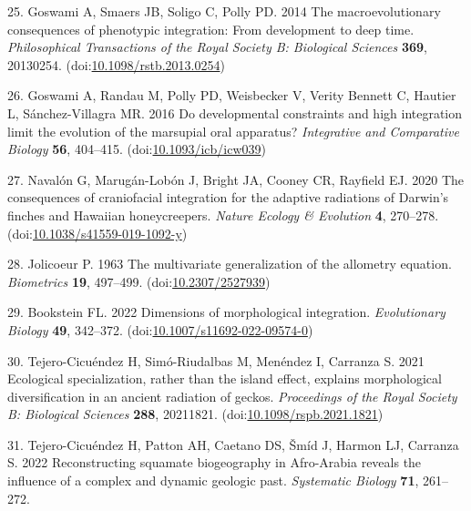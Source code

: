 \documentclass[
  11pt,
]{article}
\begin{document}
\leavevmode\hypertarget{ref-Goswami2014}{}%
25. Goswami A, Smaers JB, Soligo C, Polly PD. 2014 The macroevolutionary
consequences of phenotypic integration: From development to deep time.
\emph{Philosophical Transactions of the Royal Society B: Biological
Sciences} \textbf{369}, 20130254.
(doi:\href{https://doi.org/10.1098/rstb.2013.0254}{10.1098/rstb.2013.0254})

\leavevmode\hypertarget{ref-Goswami2016}{}%
26. Goswami A, Randau M, Polly PD, Weisbecker V, Verity Bennett C,
Hautier L, Sánchez-Villagra MR. 2016 Do developmental constraints and
high integration limit the evolution of the marsupial oral apparatus?
\emph{Integrative and Comparative Biology} \textbf{56}, 404--415.
(doi:\href{https://doi.org/10.1093/icb/icw039}{10.1093/icb/icw039})

\leavevmode\hypertarget{ref-Navalon2020}{}%
27. Navalón G, Marugán-Lobón J, Bright JA, Cooney CR, Rayfield EJ. 2020
The consequences of craniofacial integration for the adaptive radiations
of Darwin's finches and Hawaiian honeycreepers. \emph{Nature Ecology \&
Evolution} \textbf{4}, 270--278.
(doi:\href{https://doi.org/10.1038/s41559-019-1092-y}{10.1038/s41559-019-1092-y})

\leavevmode\hypertarget{ref-Jolicoeur1963}{}%
28. Jolicoeur P. 1963 The multivariate generalization of the allometry
equation. \emph{Biometrics} \textbf{19}, 497--499.
(doi:\href{https://doi.org/10.2307/2527939}{10.2307/2527939})

\leavevmode\hypertarget{ref-Bookstein2022}{}%
29. Bookstein FL. 2022 Dimensions of morphological integration.
\emph{Evolutionary Biology} \textbf{49}, 342--372.
(doi:\href{https://doi.org/10.1007/s11692-022-09574-0}{10.1007/s11692-022-09574-0})

\leavevmode\hypertarget{ref-Tejero-Cicuendez2021}{}%
30. Tejero-Cicuéndez H, Simó-Riudalbas M, Menéndez I, Carranza S. 2021
Ecological specialization, rather than the island effect, explains
morphological diversification in an ancient radiation of geckos.
\emph{Proceedings of the Royal Society B: Biological Sciences}
\textbf{288}, 20211821.
(doi:\href{https://doi.org/10.1098/rspb.2021.1821}{10.1098/rspb.2021.1821})

\leavevmode\hypertarget{ref-Tejero-Cicuendez2022}{}%
31. Tejero-Cicuéndez H, Patton AH, Caetano DS, Šmíd J, Harmon LJ,
Carranza S. 2022 Reconstructing squamate biogeography in Afro-Arabia
reveals the influence of a complex and dynamic geologic past.
\emph{Systematic Biology} \textbf{71}, 261--272.
\end{document}
